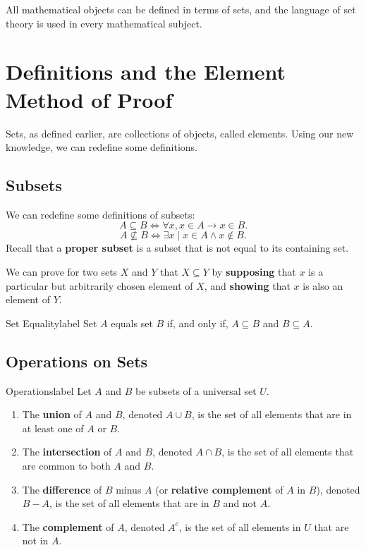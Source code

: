 \documentclass[a4paper]{report}
\begin{document}
All mathematical objects can be defined in terms of sets, and the language of set theory is used
in every mathematical subject.

\section{Definitions and the Element Method of Proof}

Sets, as defined earlier, are collections of objects, called elements. Using our new knowledge, we can
redefine some definitions.

\subsection{Subsets}

We can redefine some definitions of subsets: \[
A \subseteq B \Leftrightarrow \forall x, x \in A \to x \in B
.\] 
\[
A \not\subseteq B \Leftrightarrow \exists x  \mid x \in A \land x \not\in B
.\] 
Recall that a \textbf{proper subset} is a subset that is not equal to its containing set.

We can prove for two sets $X$ and $Y$ that $X \subseteq Y$ by \textbf{supposing} that $x$ is a particular but
arbitrarily chosen element of $X$, and \textbf{showing} that $x$ is also an element of $Y$.

\begin{definition}{Set Equality}{label}
    Set $A$ equals set $B$ if, and only if, $A \subseteq B$ and $B \subseteq A$.
\end{definition}

\subsection{Operations on Sets}

\begin{definition}{Operations}{label}
    Let $A$ and $B$ be subsets of a universal set $U$.
    \begin{enumerate}
        \item The \textbf{union} of $A$ and $B$, denoted $A \cup B$, is the set of all elements
            that are in at least one of $A$ or $B$.
        \item The \textbf{intersection} of $A$ and $B$, denoted $A \cap B$, is the set
            of all elements that are common to both $A$ and $B$.
        \item The \textbf{difference} of $B$ minus $A$ (or \textbf{relative complement}
            of $A$ in $B$), denoted $B - A$, is the set of all elements that are in
            $B$ and not $A$.
        \item The \textbf{complement} of $A$, denoted $A^c$, is the set of all elements
            in $U$ that are not in $A$.
    \end{enumerate}
\end{definition}
\end{document}
